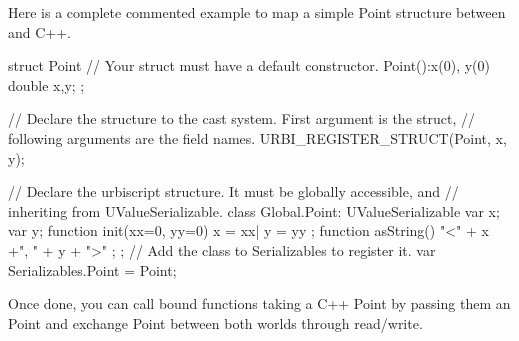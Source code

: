 Here is a complete commented example to map a simple Point structure between
\us and C++.
\begin{cxx}
struct Point
{
  // Your struct must have a default constructor.
  Point():x(0), y(0) {}
  double x,y;
};

// Declare the structure to the cast system. First argument is the struct,
// following arguments are the field names.
URBI_REGISTER_STRUCT(Point, x, y);
\end{cxx}

\begin{urbiunchecked}
// Declare the urbiscript structure. It must be globally accessible, and
// inheriting from UValueSerializable.
class Global.Point: UValueSerializable
{
  var x;
  var y;
  function init(xx=0, yy=0)
  {
     x = xx|
     y = yy
  };
  function asString()
  {
    "<" + x +", " + y  + ">"
  };
};
// Add the class to Serializables to register it.
var Serializables.Point = Point;
\end{urbiunchecked}

Once done, you can call bound functions taking a C++ Point by passing them
an \us Point and exchange Point between both worlds through \UVar read/write.

